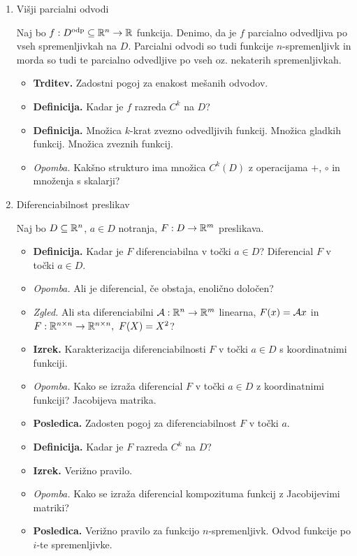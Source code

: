 \begin{enumerate}
    \item Višji parcialni odvodi
    
    Naj bo $f: D^\text{odp} \subseteq \mathbb{R}^n \to \mathbb{R}$ funkcija. Denimo, da je $f$ parcialno odvedljiva po vseh spremenljivkah na $D$. Parcialni odvodi so tudi funkcije $n$-spremenljivk in morda so tudi te parcialno odvedljive po vseh oz. nekaterih spremenljivkah.
    
    \begin{itemize}
        \item \colorbox{blue!30}{\textbf{Trditev.}} Zadostni pogoj za enakost mešanih odvodov. \todo{*}
        \item \colorbox{purple!30}{\textbf{Definicija.}} Kadar je $f$ razreda $C^k$ na $D$?
        \item \colorbox{purple!30}{\textbf{Definicija.}}  Množica $k$-krat zvezno odvedljivih funkcij. Množica gladkih funkcij. Množica zveznih funkcij.
        \item \colorbox{yellow!30}{\emph{Opomba.}} Kakšno strukturo ima množica $C^k(D)$ z operacijama $+$, $\circ$ in množenja s skalarji?
    \end{itemize}

    \item Diferenciabilnost preslikav
    
    Naj bo $D \subseteq \mathbb{R}^n$, $a \in D$ notranja, $F: D \to \mathbb{R}^m$ preslikava.
    \begin{itemize}
        \item \colorbox{purple!30}{\textbf{Definicija.}} Kadar je $F$ diferenciabilna v točki $a \in D$? Diferencial $F$ v točki $a \in D$.
        \item \colorbox{yellow!30}{\emph{Opomba.}} Ali je diferencial, če obstaja, enolično določen?
        \item \colorbox{yellow!30}{\emph{Zgled.}} Ali sta diferenciabilni $\mathcal{A}: \mathbb{R}^n \to \mathbb{R}^m$ linearna, $F(x) = \mathcal{A}x$ in $F: 
        \mathbb{R}^{n \times n} \to \mathbb{R}^{n \times n}, \ F(X) = X^2$?
        \item \colorbox{blue!30}{\textbf{Izrek.}} Karakterizacija diferenciabilnosti $F$ v točki $a \in D$ s koordinatnimi funkciji. 
        \item \colorbox{yellow!30}{\emph{Opomba.}} Kako se izraža diferencial $F$ v točki $a \in D$ z koordinatnimi funkciji? Jacobijeva matrika.
        \item \colorbox{orange!30}{\textbf{Posledica.}} Zadosten pogoj za diferenciabilnost $F$ v točki $a$.
        \item \colorbox{purple!30}{\textbf{Definicija.}} Kadar je $F$ razreda $C^k$ na $D$?
        \item \colorbox{blue!30}{\textbf{Izrek.}} Verižno pravilo. \todo{*}
        \item \colorbox{yellow!30}{\emph{Opomba.}} Kako se izraža diferencial kompozituma funkcij z Jacobijevimi matriki?
        \item \colorbox{orange!30}{\textbf{Posledica.}} Verižno pravilo za funkcijo $n$-spremenljivk. Odvod funkcije po \(i\)-te spremenljivke.
    \end{itemize}
\end{enumerate}

